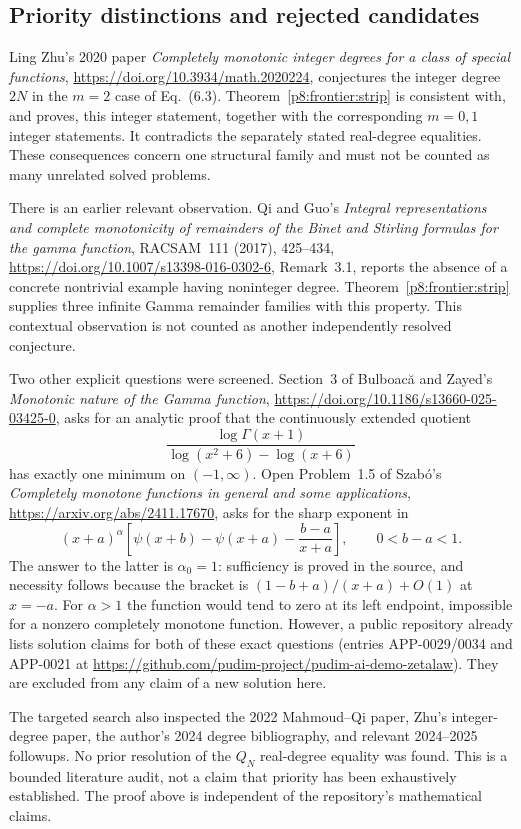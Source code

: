 \documentclass[11pt,a4paper]{article}
\theoremstyle{definition}
\theoremstyle{remark}
\numberwithin{equation}{section}
\begin{document}
\subsection{Priority distinctions and rejected candidates}
Ling Zhu's 2020 paper \emph{Completely monotonic integer degrees for a
class of special functions}, \url{https://doi.org/10.3934/math.2020224},
conjectures the integer degree $2N$ in the $m=2$ case of Eq.~(6.3).
Theorem~\ref{p8:frontier:strip} is consistent with, and proves, this integer
statement, together with the corresponding $m=0,1$ integer statements.
It contradicts the separately stated real-degree equalities.
These consequences concern one structural family and must not be
counted as many unrelated solved problems.

There is an earlier relevant observation. Qi and Guo's
\emph{Integral representations and complete monotonicity of remainders
of the Binet and Stirling formulas for the gamma function},
RACSAM~111 (2017), 425--434,
\url{https://doi.org/10.1007/s13398-016-0302-6}, Remark~3.1,
reports the absence of a concrete nontrivial example having noninteger
degree. Theorem~\ref{p8:frontier:strip} supplies three infinite Gamma
remainder families with this property. This contextual observation is
not counted as another independently resolved conjecture.

Two other explicit questions were screened. Section~3 of Bulboac\u{a}
and Zayed's \emph{Monotonic nature of the Gamma function},
\url{https://doi.org/10.1186/s13660-025-03425-0}, asks for an analytic
proof that the continuously extended quotient
\[
 \frac{\log\Gamma(x+1)}{\log(x^2+6)-\log(x+6)}
\]
has exactly one minimum on $(-1,\infty)$. Open Problem~1.5 of Szab\'o's
\emph{Completely monotone functions in general and some applications},
\url{https://arxiv.org/abs/2411.17670}, asks for the sharp exponent in
\[
 (x+a)^\alpha\left[\psi(x+b)-\psi(x+a)-\frac{b-a}{x+a}\right],
 \qquad 0<b-a<1.
\]
The answer to the latter is $\alpha_0=1$: sufficiency is proved in the
source, and necessity follows because the bracket is
$(1-b+a)/(x+a)+O(1)$ at $x=-a$. For $\alpha>1$ the function would tend
to zero at its left endpoint, impossible for a nonzero completely
monotone function. However, a public repository already lists solution
claims for both of these exact questions (entries APP-0029/0034 and
APP-0021 at
\url{https://github.com/pudim-project/pudim-ai-demo-zetalaw}).
They are excluded from any claim of a new solution here.

The targeted search also inspected the 2022 Mahmoud--Qi paper,
Zhu's integer-degree paper, the author's 2024 degree bibliography,
and relevant 2024--2025 followups. No prior resolution of the
$Q_N$ real-degree equality was found. This is a bounded literature audit,
not a claim that priority has been exhaustively established. The proof
above is independent of the repository's mathematical claims.
\end{document}
